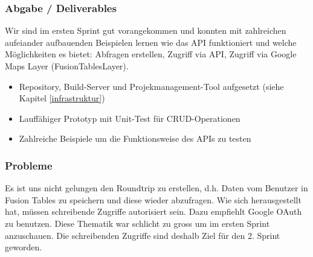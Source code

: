 \subsubsection{Abgabe / Deliverables}
Wir sind im ersten Sprint gut vorangekommen und konnten mit zahlreichen aufeiander aufbauenden Beispielen lernen wie das \gls{API} funktioniert und welche Möglichkeiten es bietet: Abfragen erstellen, Zugriff via \gls{API}, Zugriff via Google Maps Layer (FusionTablesLayer).

\begin{itemize}
	\item Repository, Build-Server und Projekmanagement-Tool aufgesetzt (siehe Kapitel \ref{infrastruktur})
	\item Lauffähiger Prototyp mit Unit-Test für \gls{CRUD}-Operationen
	\item Zahlreiche Beispiele um die Funktionsweise des \gls{API}s zu testen
\end{itemize}

\subsubsection{Probleme}
Es ist uns nicht gelungen den Roundtrip zu erstellen, d.h. Daten vom Benutzer in Fusion Tables zu speichern und diese wieder abzufragen. Wie sich herausgestellt hat, müssen schreibende Zugriffe autorisiert sein. Dazu empfiehlt Google \gls{OAuth} zu benutzen. Diese Thematik war schlicht zu gross um im ersten Sprint anzuschauen. Die schreibenden Zugriffe sind deshalb Ziel für den 2. Sprint geworden. 